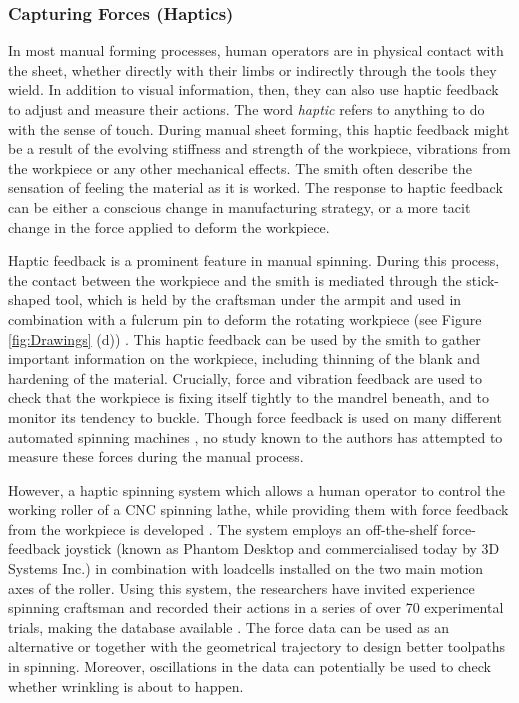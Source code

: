 \subsubsection{Capturing Forces (Haptics)}
In most manual forming processes, human operators are in physical contact with the sheet, whether directly with their limbs or indirectly through the tools they wield. In addition to visual information, then, they can also use haptic feedback to adjust and measure their actions. The word \textit{haptic} refers to anything to do with the sense of touch. During manual sheet forming, this haptic feedback might be a result of the evolving stiffness and strength of the workpiece, vibrations from the workpiece or any other mechanical effects. The smith often describe the sensation of feeling the material as it is worked. The response to haptic feedback can be either a conscious change in manufacturing strategy, or a more tacit change in the force applied to deform the workpiece. 

Haptic feedback is a prominent feature in manual spinning. During this process, the contact between the workpiece and the smith is mediated through the stick-shaped tool, which is held by the craftsman under the armpit and used in combination with a fulcrum pin to deform the rotating workpiece (see Figure \ref{fig:Drawings} (d)) . This haptic feedback can be used by the smith to gather important information on the workpiece, including thinning of the blank and hardening of the material. Crucially, force and vibration feedback are used to check that the workpiece is fixing itself tightly to the mandrel beneath, and to monitor its tendency to buckle. Though force feedback is used on many different automated spinning machines \citep{Arai2006Force-controlledMotors}, no study known to the authors has attempted to measure these forces during the manual process. 

However, a haptic spinning system which allows a human operator to control the working roller of a CNC spinning lathe, while providing them with force feedback from the workpiece is developed \citep{Russo2019HapticSpinning}. The system employs an off-the-shelf force-feedback joystick (known as Phantom Desktop and commercialised today by 3D Systems Inc.) in combination with loadcells installed on the two main motion axes of the roller. Using this system, the researchers have invited experience spinning craftsman and recorded their actions in a series of over 70 experimental trials, making the database available \citep{Russo2020ResearchSpinning}. The force data can be used as an alternative or together with the geometrical trajectory to design better toolpaths in spinning. Moreover, oscillations in the data can potentially be used to check whether wrinkling is about to happen. 

